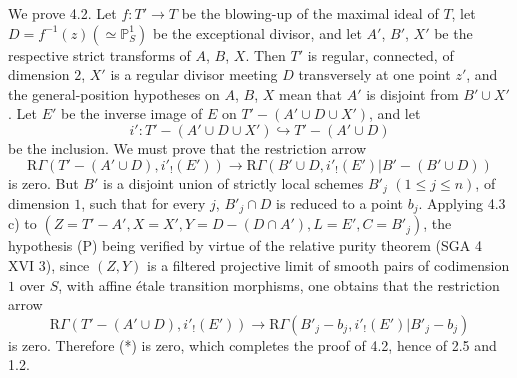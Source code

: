 \documentclass[11pt]{article}
\begin{document}
We prove 4.2. Let $f:T'\to T$ be the blowing-up of the maximal ideal of $T$, let $D=f^{-1}(z)(\simeq\mathbb P^1_S)$ be the exceptional divisor, and let $A'$, $B'$, $X'$ be the respective strict transforms of $A$, $B$, $X$. Then $T'$ is regular, connected, of dimension $2$, $X'$ is a regular divisor meeting $D$ transversely at one point $z'$, and the general-position hypotheses on $A$, $B$, $X$ mean that $A'$ is disjoint from $B'\cup X'$. Let $E'$ be the inverse image of $E$ on $T'-(A'\cup D\cup X')$, and let
\[
i':T'-(A'\cup D\cup X')\hookrightarrow T'-(A'\cup D)
\]
be the inclusion. We must prove that the restriction arrow
\[
\mathrm R\Gamma(T'-(A'\cup D),i'_!(E'))
\longrightarrow
\mathrm R\Gamma(B'\cup D,i'_!(E')|B'-(B'\cup D))
\tag{*}
\]
is zero. But $B'$ is a disjoint union of strictly local schemes $B'_j$ $(1\le j\le n)$, of dimension $1$, such that for every $j$, $B'_j\cap D$ is reduced to a point $b_j$. Applying 4.3 c) to $(Z=T'-A', X=X', Y=D-(D\cap A'), L=E', C=B'_j)$, the hypothesis (P) being verified by virtue of the relative purity theorem (SGA 4 XVI 3), since $(Z,Y)$ is a filtered projective limit of smooth pairs of codimension $1$ over $S$, with affine étale transition morphisms, one obtains that the restriction arrow
\[
\mathrm R\Gamma(T'-(A'\cup D),i'_!(E'))
\longrightarrow
\mathrm R\Gamma(B'_j-b_j,i'_!(E')|B'_j-b_j)
\]
is zero. Therefore (*) is zero, which completes the proof of 4.2, hence of 2.5 and 1.2.
\end{document}
